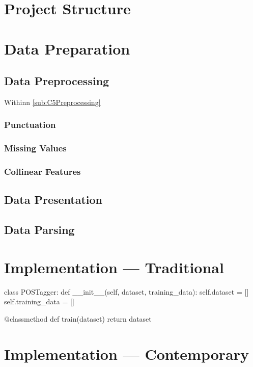 \section{Project Structure}

\section{Data Preparation}

\subsection{Data Preprocessing}
Withinn \autoref{sub:C5Preprocessing}

\subsubsection{Punctuation}
\subsubsection{Missing Values}
\subsubsection{Collinear Features}

\subsection{Data Presentation}

\subsection{Data Parsing}

\section{Implementation --- Traditional}

\begin{python}
    class POSTagger:
        def __init__(self, dataset, training_data):
            self.dataset = []
            self.training_data = []

        @classmethod
        def train(dataset)
            return dataset
\end{python}

\section{Implementation --- Contemporary}

